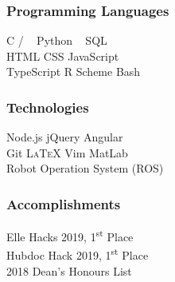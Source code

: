 \documentclass{mxresume}
\begin{document}
\begin{resumeheading}
\headingPad
\end{resumeheading}
%
\begin{minipage}[t]{0.26\textwidth}
\begin{sidebar}
\\[1mm]
 \\[1mm]
 \\[1mm]
\subsubsection*{Programming Languages}
C / \Cpp\ \Bullet 
Python \Bullet 
\Csharp\ \Bullet 
SQL \\[1mm]
HTML \Bullet 
CSS \Bullet 
JavaScript \\[1mm]
TypeScript \Bullet 
R \Bullet 
Scheme \Bullet 
Bash
%
\subsubsection*{Technologies}
Node.js \Bullet 
jQuery \Bullet 
Angular\\[1mm]
Git \Bullet 
\textsc{\LaTeX} \Bullet 
Vim \Bullet 
MatLab \\[1mm]
Robot Operation System (ROS) 
\subsubsection*{Accomplishments}
Elle Hacks 2019, 1\textsuperscript{st} Place \\[1mm]
Hubdoc Hack 2019, 1\textsuperscript{st} Place \\[1mm]
2018 Dean's Honours List

\end{sidebar}
\end{minipage}
\end{document}
